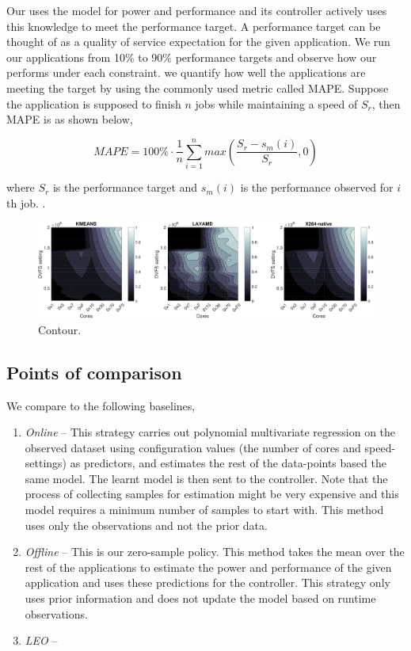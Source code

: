 Our \SYSTEM{} uses the model for power and performance and its controller actively uses this knowledge to meet the performance target. A performance target can be thought of as a quality of service expectation for the given application. We run our applications from 10\% to 90\% performance targets and observe how our \SYSTEM{} performs under each constraint. we quantify how well the applications are meeting the target by using the commonly used metric called MAPE. Suppose the application is supposed to finish $n$ jobs while maintaining a speed of $S_r$, then MAPE is as shown below,

\begin{equation}
MAPE = 100\% \cdot \frac{1}{n} \sum\limits_{i=1}^{n} max \left( \frac{S_{r} - s_m(i)}{S_r},0 \right)
\end{equation}

where $S_{r}$ is the performance target and $s_m(i)$ is the performance observed for $i$th job.
.
\begin{figure}
\centering
\includegraphics[scale=0.4]{figures/performance-contour3.pdf}

\caption{Contour.}
  \label{fig:contour}
\end{figure}
\subsection{Points of comparison}

We compare \SYSTEM{} to the following baselines,

\begin{enumerate}
\item \textit{Online} -- This strategy carries out polynomial
  multivariate regression on the observed dataset using configuration
  values (the number of cores and speed-settings) as
  predictors, and estimates the rest of the data-points based the same
  model. The learnt model is then sent to the controller. Note that the process of collecting samples for estimation might be very expensive and this model requires a minimum number of samples to start with. This method uses only the observations and
  not the prior data.
\item \textit{Offline} -- This is our zero-sample policy. This method takes the mean over the rest of the applications to estimate the power and performance of the given application and uses these predictions for the controller.
  This strategy only uses prior information and does not update the model
  based on runtime observations.

\item \textit{LEO} -- 
\end{enumerate}


